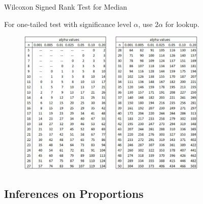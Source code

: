 \begin{frame}{Wilcoxon Signed Rank Test for Median}

\justifying
{} For one-tailed test with significance level $\alpha$, use $2\alpha$ for lookup.
\begin{figure}[htbp]
	\centering
	\includegraphics[width=9cm]{./images/signed-rank-test.png}
\end{figure}

\end{frame}


\subsection{Inferences on Proportions}

